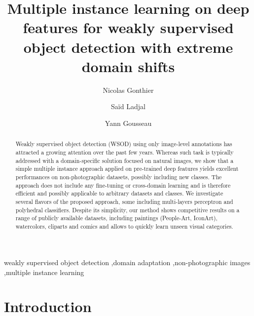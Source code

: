\documentclass[preprint]{elsarticle}
\begin{document}
\setcounter{secnumdepth}{3} 

\begin{frontmatter}

\title{Multiple instance learning on deep features for weakly supervised object detection with extreme domain shifts}
\author[telecomadress,UPSaclay]{Nicolas Gonthier}

\author[telecomadress]{Sa\"id Ladjal}
\author[telecomadress]{Yann Gousseau}
\address[telecomadress]{LTCI, T\'el\'ecom Paris, Institut Polytechnique de Paris, 19 Place Marguerite Perey, 91120 Palaiseau, France}
\address[UPSaclay]{Universit\'e Paris-Saclay, 91190, Saint-Aubin, France}



\begin{abstract}
Weakly supervised object detection (WSOD) using only image-level annotations has attracted a growing attention over the past few years. Whereas such task is typically addressed with a domain-specific solution focused on natural images, we show that a simple multiple instance approach applied on pre-trained deep features yields excellent performances on non-photographic datasets, possibly including new classes. The approach does not include any fine-tuning or cross-domain learning and is therefore efficient and possibly applicable to arbitrary datasets and classes. We investigate several flavors of the proposed approach, some including multi-layers perceptron and polyhedral classifiers. 
Despite its simplicity, our method shows competitive results on a range of publicly available datasets, including paintings (People-Art, IconArt), watercolors, cliparts and comics and allows to quickly learn unseen visual categories.


\end{abstract}

\begin{keyword}
weakly supervised object detection \sep domain adaptation  \sep non-photographic images \sep multiple instance learning 
\end{keyword}

\end{frontmatter}



\section{Introduction}
\end{document}
